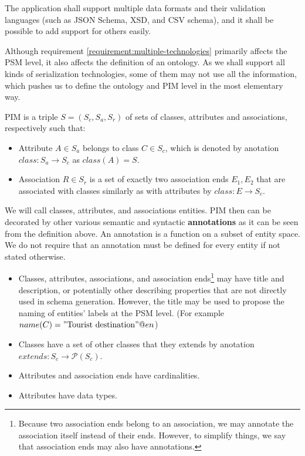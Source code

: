 \begin{requirement}
    \label{requirement:multiple-technologies}
    The application shall support multiple data formats and their validation languages (such as JSON Schema, XSD, and CSV schema), and it shall be possible to add support for others easily.
\end{requirement}

Although requirement \ref{requirement:multiple-technologies} primarily affects the PSM level, it also affects the definition of an ontology. As we shall support all kinds of serialization technologies, some of them may not use all the information, which pushes us to define the ontology and PIM level in the most elementary way.

\begin{definition}[PIM] PIM is a triple $S=(S_c, S_a, S_r)$ of sets of classes, attributes and associations, respectively such that:
    \begin{itemize}
        \item Attribute $A \in S_a$ belongs to class $C \in S_c$, which is denoted by anotation ${class}: S_a \rightarrow S_c$ as ${class}(A)=S$.
        \item Association $R \in S_r$ is a set of exactly two association ends ${E_1, E_2}$ that are associated with classes similarly as with attributes by ${class}: E \rightarrow S_c$.
    \end{itemize}

    We will call classes, attributes, and associations entities. PIM then can be decorated by other various semantic and syntactic \textbf{annotations} as it can be seen from the definition above. An annotation is a function on a subset of entity space. We do not require that an annotation must be defined for every entity if not stated otherwise. %

    \begin{itemize}
        \item Classes, attributes, associations, and association ends\footnote{Because two association ends belong to an association, we may annotate the association itself instead of their ends. However, to simplify things, we say that association ends may also have annotations.} may have title and description, or potentially other describing properties that are not directly used in schema generation. However, the title may be used to propose the naming of entities' labels at the PSM level. (For example $name(C)="\textrm{Tourist destination}"@en$)
        \item Classes have a set of other classes that they extends by anotation $extends: S_c \rightarrow \mathcal{P}(S_c)$.
        \item Attributes and association ends have cardinalities.
        \item Attributes have data types.
    \end{itemize}
\end{definition}


